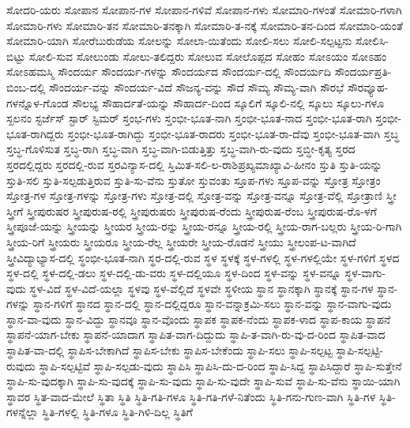 {ಸೋದರಿ-ಯರು
ಸೋಪಾನ
ಸೋಪಾನ-ಗಳ
ಸೋಪಾನ-ಗಳಿವೆ
ಸೋಪಾನ-ಗಳು
ಸೋಮಾರಿ-ಗಳಂತೆ
ಸೋಮಾರಿ-ಗಳಾಗಿ
ಸೋಮಾರಿ-ಗಳು
ಸೋಮಾರಿ-ತನ
ಸೋಮಾರಿ-ತನಕ್ಕಾಗಿ
ಸೋಮಾರಿ-ತ-ನಕ್ಕೆ
ಸೋಮಾರಿ-ತನ-ದಿಂದ
ಸೋಮಾರಿ-ಯಂತೆ
ಸೋಮಾರಿ-ಯಾಗಿ
ಸೋರೆಬುರುಡೆಯ
ಸೋಲನ್ನು
ಸೋಲಾ-ಯಿತೆಂದು
ಸೋಲಿ-ಸಲು
ಸೋಲಿ-ಸಲ್ಪಟ್ಟನು
ಸೋಲಿಸಿ-ಬಿಟ್ಟು
ಸೋಲಿ-ಸುವ
ಸೋಲುಂಡು
ಸೋಲು-ತಲಿದ್ದರು
ಸೋಲುವ
ಸೋಲೊಪ್ಪದ
ಸೋಹಂ
ಸೋಽಯಂ
ಸೋಽಹಂ
ಸೋಽಹಮಸ್ಮಿ
ಸೌಂದರ್ಯ
ಸೌಂದರ್ಯ-ಗಳನ್ನು
ಸೌಂದರ್ಯದ
ಸೌಂದರ್ಯ-ದಲ್ಲಿ
ಸೌಂದರ್ಯದಿ
ಸೌಂದರ್ಯಪ್ರತಿ-ಬಿಂಬ-ದಲ್ಲಿ
ಸೌಂದರ್ಯ-ವನ್ನು
ಸೌಂದರ್ಯ-ವಿದೆ
ಸೌಜನ್ಯ-ವನ್ನು
ಸೌದೆ
ಸೌಮ್ಯ
ಸೌಮ್ಯ-ವಾಗಿ
ಸೌರಭೆ
ಸೌರವ್ಯೂಹ-ಗಳನ್ನೊಳ-ಗೊಂಡ
ಸೌಲಭ್ಯ
ಸೌಹಾರ್ದತೆ-ಯನ್ನು
ಸೌಹಾರ್ದ-ದಿಂದ
ಸ್ಕೂಲಿಗೆ
ಸ್ಕೂಲಿ-ನಲ್ಲಿ
ಸ್ಕೂಲು
ಸ್ಕೂಲು-ಗಳೂ
ಸ್ಖಲನಂ
ಸ್ಟರ್ಜೆಸ್
ಸ್ಟಾರ್
ಸ್ಟಿಮರ್
ಸ್ತಂಭ-ಗಳು
ಸ್ತಂಭೀ-ಭೂತ-ನಾಗಿ
ಸ್ತಂಭೀ-ಭೂತ-ನಾದ
ಸ್ತಂಭೀ-ಭೂತ-ರಾಗಿ
ಸ್ತಂಭೀ-ಭೂತ-ರಾಗಿದ್ದರು
ಸ್ತಂಭೀ-ಭೂತ-ರಾಗಿದ್ದು
ಸ್ತಂಭೀ-ಭೂತ-ರಾದರು
ಸ್ತಂಭೀ-ಭೂತ-ರಾ-ದೆವು
ಸ್ತಂಭೀ-ಭೂತ-ವಾಗಿ
ಸ್ತಬ್ಧ
ಸ್ತಬ್ಧ-ಗೊಳಿಸುತ
ಸ್ತಬ್ಧ-ರಾಗಿ
ಸ್ತಬ್ಧ-ವಾಗಿ
ಸ್ತಬ್ಧ-ವಾಗಿ-ಬಿಡುತ್ತಿತ್ತು
ಸ್ತಬ್ಧ-ವಾಗಿ-ರು-ವುದು
ಸ್ತಬ್ಧೀ-ಕೃತ್ಯ
ಸ್ತರದ
ಸ್ತರದಲ್ಲಿದ್ದರು
ಸ್ತರದಲ್ಲಿ-ರುವ
ಸ್ತರವಿನ್ಯಾಸ-ದಲ್ಲಿ
ಸ್ತಿಮಿತ-ಸಲಿ-ಲ-ರಾಶಿಪ್ರಖ್ಯಮಾಖ್ಯಾವಿ-ಹೀನಂ
ಸ್ತುತಿ
ಸ್ತುತಿ-ಯನ್ನು
ಸ್ತುತಿ-ಸಲಿ
ಸ್ತುತಿ-ಸಲ್ಪಡುತ್ತಿರುವ
ಸ್ತುತಿ-ಸು-ವೆನು
ಸ್ತುತೋ
ಸ್ತುವಂತು
ಸ್ತೂಪ-ಗಳು
ಸ್ತೂಪ-ವನ್ನು
ಸ್ತೋತ್ರ
ಸ್ತೋತ್ರಂ
ಸ್ತೋತ್ರ-ಗಳ
ಸ್ತೋತ್ರ-ಗಳನ್ನು
ಸ್ತೋತ್ರ-ಗಳು
ಸ್ತೋತ್ರ-ದಲ್ಲಿ
ಸ್ತೋತ್ರ-ವನ್ನು
ಸ್ತೋತ್ರ-ವನ್ನೂ
ಸ್ತೋತ್ರ-ವೆಲ್ಲಿ
ಸ್ತೋತ್ರಾಣಿ
ಸ್ತ್ರೀ
ಸ್ತ್ರೀಗೆ
ಸ್ತ್ರೀಪುರುಷರ
ಸ್ತ್ರೀಪುರುಷ-ರಲ್ಲಿ
ಸ್ತ್ರೀಪುರುಷರು
ಸ್ತ್ರೀಪುರುಷ-ರೆಂದು
ಸ್ತ್ರೀಪುರುಷ-ರೆಂಬ
ಸ್ತ್ರೀಪುರುಷ-ರೊ-ಳಗೆ
ಸ್ತ್ರೀಪೂಜೆ-ಯನ್ನು
ಸ್ತ್ರೀಯನ್ನು
ಸ್ತ್ರೀಯರ
ಸ್ತ್ರೀಯ-ರನ್ನು
ಸ್ತ್ರೀಯ-ರನ್ನೂ
ಸ್ತ್ರೀಯ-ರಲ್ಲಿ
ಸ್ತ್ರೀಯ-ರಾಗ-ಬಲ್ಲರು
ಸ್ತ್ರೀಯ-ರಿ-ಗಾಗಿ
ಸ್ತ್ರೀಯ-ರಿಗೆ
ಸ್ತ್ರೀಯರು
ಸ್ತ್ರೀಯರೂ
ಸ್ತ್ರೀಯ-ರೆಲ್ಲ
ಸ್ತ್ರೀಯರೇ
ಸ್ತ್ರೀಯ-ರೊಡನೆ
ಸ್ತ್ರೀಯು
ಸ್ತ್ರೀಲಂಪ-ಟ-ವಾಗಿದೆ
ಸ್ತ್ರೀವಿದ್ಯಾಭ್ಯಾಸ-ದಲ್ಲಿ
ಸ್ಥಂಭೀ-ಭೂತ-ನಾಗಿ
ಸ್ಥರ-ದಲ್ಲಿ-ರುವ
ಸ್ಥಳ
ಸ್ಥಳಕ್ಕೆ
ಸ್ಥಳ-ಗಳಲ್ಲಿ
ಸ್ಥಳ-ಗಳಲ್ಲಿಯೇ
ಸ್ಥಳ-ಗಳಿಗೆ
ಸ್ಥಳದ
ಸ್ಥಳ-ದಲ್ಲಿ
ಸ್ಥಳ-ದಲ್ಲಿ-ಡಲು
ಸ್ಥಳ-ದಲ್ಲಿ-ಡು-ವರು
ಸ್ಥಳ-ದಲ್ಲಿಯೂ
ಸ್ಥಳ-ದಿಂದ
ಸ್ಥಳ-ವನ್ನು
ಸ್ಥಳ-ವನ್ನೂ
ಸ್ಥಳ-ವಾಗು-ವುದು
ಸ್ಥಳ-ವಿದೆ
ಸ್ಥಳ-ವಿದೆ-ಯಲ್ಲಾ
ಸ್ಥಳವು
ಸ್ಥಳ-ವೆಲ್ಲಿದೆ
ಸ್ಥಳವೇ
ಸ್ಥಳೀಯ
ಸ್ಥಾನ
ಸ್ಥಾನಕ್ಕಾಗಿ
ಸ್ಥಾನಕ್ಕೆ
ಸ್ಥಾನ-ಗಳ
ಸ್ಥಾನ-ಗಳನ್ನು
ಸ್ಥಾನ-ಗಳಿಗೆ
ಸ್ಥಾನದ
ಸ್ಥಾನ-ದಲ್ಲಿ
ಸ್ಥಾನ-ದಲ್ಲಿದ್ದರೂ
ಸ್ಥಾನ-ವನ್ನಾಕ್ರಮಿ-ಸಲು
ಸ್ಥಾನ-ವನ್ನು
ಸ್ಥಾನ-ವಾಗು-ವುದು
ಸ್ಥಾನ-ವಾ-ವುದು
ಸ್ಥಾನ-ವಿದ್ದು
ಸ್ಥಾನವೂ
ಸ್ಥಾನ-ವೊಂದು
ಸ್ಥಾಪಕ
ಸ್ಥಾಪಕ-ನೆಂದು
ಸ್ಥಾಪಕ-ಳಾದ
ಸ್ಥಾಪ-ಕಾಯ
ಸ್ಥಾಪನೆ
ಸ್ಥಾಪನೆ-ಯಾಗ-ಬೇಕು
ಸ್ಥಾಪನೆ-ಯಾದಾಗ
ಸ್ಥಾಪಿತ-ವಾಗ-ದಿದ್ದುದು
ಸ್ಥಾಪಿ-ತ-ವಾಗಿ-ರು-ವು-ದ-ರಿಂದ
ಸ್ಥಾಪಿತ-ವಾದ
ಸ್ಥಾಪಿತ-ವಾ-ದಲ್ಲಿ
ಸ್ಥಾಪಿಸ-ಬೇಕಾಗಿದೆ
ಸ್ಥಾಪಿಸ-ಬೇಕು
ಸ್ಥಾಪಿಸ-ಬೇಕೆಂದು
ಸ್ಥಾಪಿ-ಸಲು
ಸ್ಥಾಪಿ-ಸಲ್ಪಟ್ಟ
ಸ್ಥಾಪಿ-ಸಲ್ಪಟ್ಟಿ-ರುವುದು
ಸ್ಥಾಪಿ-ಸಲ್ಪಟ್ಟಿವೆ
ಸ್ಥಾಪಿ-ಸಲ್ಪಡು-ವುದು
ಸ್ಥಾಪಿಸಿ
ಸ್ಥಾಪಿಸಿ-ದು-ದ-ರಿಂದ
ಸ್ಥಾಪಿ-ಸಿದ್ದ
ಸ್ಥಾಪಿಸಿದ್ದಾರೆ
ಸ್ಥಾಪಿ-ಸುತ್ತೇನೆ
ಸ್ಥಾಪಿ-ಸು-ವುದಕ್ಕಾಗಿ
ಸ್ಥಾಪಿ-ಸು-ವುದಕ್ಕೆ
ಸ್ಥಾಪಿ-ಸು-ವುದು
ಸ್ಥಾಪಿ-ಸು-ವುದೇ
ಸ್ಥಾಪಿ-ಸುವೆ
ಸ್ಥಾಪಿ-ಸು-ವೆನು
ಸ್ಥಾಯಿ-ಯಾಗಿ
ಸ್ಥಾವರ
ಸ್ಥಿತ-ವಾದ-ಮೇಲೆ
ಸ್ಥಿತಾ
ಸ್ಥಿತಿ
ಸ್ಥಿತಿ-ಗತಿ-ಗಳೂ
ಸ್ಥಿತಿ-ಗತಿ-ಗಳೆ-ನಿತೆಂದು
ಸ್ಥಿತಿ-ಗನು-ಗುಣ-ವಾಗಿ
ಸ್ಥಿತಿ-ಗಳ
ಸ್ಥಿತಿ-ಗಳನ್ನೆಲ್ಲಾ
ಸ್ಥಿತಿ-ಗಳಲ್ಲಿ
ಸ್ಥಿತಿ-ಗಳೂ
ಸ್ಥಿತಿ-ಗಿಳಿ-ದಿಲ್ಲ
ಸ್ಥಿತಿಗೆ
}
